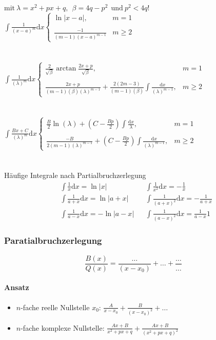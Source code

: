 \documentclass[6pt,a4paper]{scrartcl}
\newcommand{\abs}[1]{\ensuremath{\left\vert#1\right\vert}}
\begin{document}
\begin{multicols*}{4}
$\text{mit} ~ \lambda=x^2+px+q, ~~ \beta=4q-p^2 ~~ \text{und} ~p^2<4q$!
$\int\frac{1}{(x-a)^m}\mathrm dx \begin{cases} \ln\left|x-a\right|, & m=1\\ \\ \frac{-1}{(m-1)(x-a)^{m-1}} &m\geq2 \end{cases}$\\ \\ \\
$\int\frac{1}{(\lambda)^m} \mathrm dx \begin{cases} \frac{2}{\sqrt{\beta}} \arctan\frac{2x+p}{\sqrt{\beta}}, &m=1\\ \\ \frac{2x+p}{(m-1)(\beta)(\lambda)^{m-1}}+\frac{2(2m-3)}{(m-1)(\beta)} \int\frac{\mathrm dx}{(\lambda)^{m-1}}, &m\geq2 \end{cases}$\\ \\ \\
$\int\frac{Bx+C}{(\lambda)^m} \mathrm dx \begin{cases} \frac{B}{2} \ln(\lambda) + (C-\frac{Bp}{2}) \int\frac{\mathrm dx}{\lambda}, &m=1\\ \\ \frac{-B}{2(m-1)(\lambda)^{m-1}} + (C-\frac{Bp}{2}) \int\frac{\mathrm dx}{(\lambda)^{m-1}}, &m\geq2 \end{cases}$\\ \\ \\
Häufige Integrale nach Partialbruchzerlegung
\begin{align*}
&\int\frac{1}{x}\mathrm dx = \ln\abs{x}&&\int\frac{1}{x^2}\mathrm dx = -\frac{1}{x} \\
&\int\frac{1}{a+x}\mathrm dx = \ln\abs{a+x} && \int\frac{1}{(a+x)^2}\mathrm dx = -\frac{1}{a+x} \\
&\int\frac{1}{a-x}\mathrm dx = -\ln\abs{a-x} && \int\frac{1}{(a-x)^2}\mathrm dx = \frac{1}{a-x}1
\end{align*}
\subsubsection{Paratialbruchzerlegung}
\begin{equation*}
\frac{B(x)}{Q(x)} = \frac{\ldots}{(x - x_0)} + \ldots + \frac{\ldots}{\ldots}
\end{equation*}
\paragraph{Ansatz}
\begin{itemize}\itemsep0pt
\item $n$-fache reelle Nullstelle $x_0$: $\frac{A}{x-x_0}+\frac{B}{(x-x_0)^2} +\dots$
\item $n$-fache komplexe Nullstelle: $\frac{Ax+B}{x^2+px+q}+\frac{Ax+B}{(x^2+px+q)^2}$
\end{itemize}

\end{multicols*}
\end{document}

